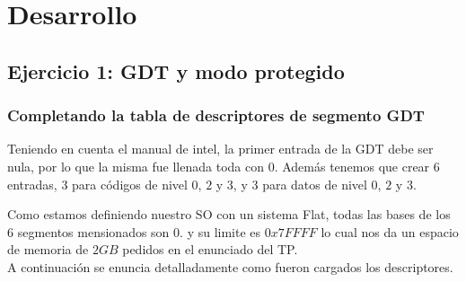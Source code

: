 \documentclass[a4paper,10pt,twoside]{article}
\begin{document}
\newpage




\tableofcontents

\newpage




\section{Desarrollo}
\subsection{Ejercicio 1: GDT y modo protegido}
\subsubsection{Completando la tabla de descriptores de segmento GDT}
Teniendo en cuenta el manual de intel, la primer entrada de la GDT debe ser nula, por lo que la misma fue llenada toda con $0$.
Además tenemos que crear $6$ entradas, $3$ para códigos de nivel $0$, $2$ y $3$, y $3$ para datos de nivel $0$, $2$ y $3$. 

Como estamos definiendo nuestro SO con un sistema Flat, todas las bases de los $6$ segmentos mensionados son $0$. y su limite es $0x7FFFF$ lo cual nos da un espacio de memoria de $2GB$ pedidos en el enunciado del TP. \\

A continuación se enuncia detalladamente como fueron cargados los descriptores. \\
\end{document}
